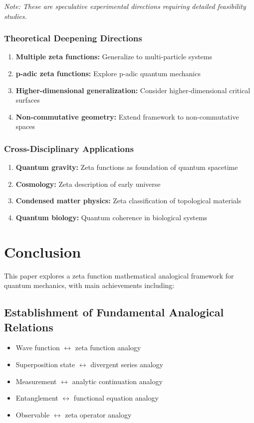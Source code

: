 \documentclass[11pt]{article}
\theoremstyle{plain}
\theoremstyle{definition}
\theoremstyle{remark}
\begin{document}
\textit{Note: These are speculative experimental directions requiring detailed feasibility studies.}

\subsubsection{Theoretical Deepening Directions}

\begin{enumerate}
\item \textbf{Multiple zeta functions:} Generalize to multi-particle systems
\item \textbf{p-adic zeta functions:} Explore p-adic quantum mechanics
\item \textbf{Higher-dimensional generalization:} Consider higher-dimensional critical surfaces
\item \textbf{Non-commutative geometry:} Extend framework to non-commutative spaces
\end{enumerate}

\subsubsection{Cross-Disciplinary Applications}

\begin{enumerate}
\item \textbf{Quantum gravity:} Zeta functions as foundation of quantum spacetime
\item \textbf{Cosmology:} Zeta description of early universe
\item \textbf{Condensed matter physics:} Zeta classification of topological materials
\item \textbf{Quantum biology:} Quantum coherence in biological systems
\end{enumerate}

\section{Conclusion}

This paper explores a zeta function mathematical analogical framework for quantum mechanics, with main achievements including:

\subsection{Establishment of Fundamental Analogical Relations}
\begin{itemize}
\item Wave function $\leftrightarrow$ zeta function analogy
\item Superposition state $\leftrightarrow$ divergent series analogy
\item Measurement $\leftrightarrow$ analytic continuation analogy
\item Entanglement $\leftrightarrow$ functional equation analogy
\item Observable $\leftrightarrow$ zeta operator analogy
\end{itemize}
\end{document}
